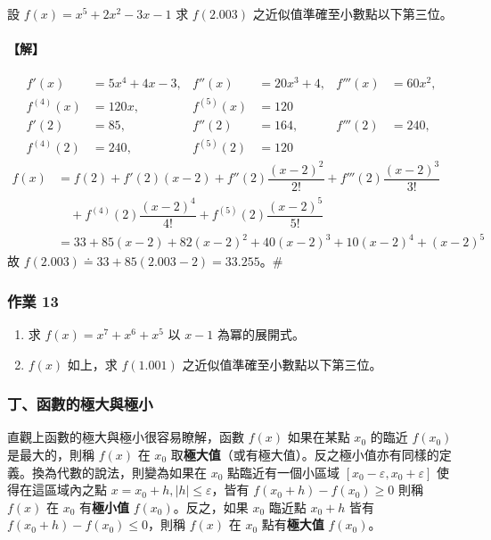 \begin{example}\label{ex:b6s-2-21}
設 $f(x)=x^5+2x^2-3x-1$ 求 $f(2.003)$ 之近似值準確至小數點以下第三位。
\end{example}

\paragraph{【解】}
\begin{align*}
f'(x) &= 5x^4+4x-3, & f''(x) &= 20x^3+4, & f'''(x) &= 60x^2, \\
f^{(4)}(x) &= 120x, & f^{(5)}(x) &= 120 \\
f'(2) &= 85, & f''(2) &= 164, & f'''(2) &= 240, \\
f^{(4)}(2) &= 240, & f^{(5)}(2) &= 120
\end{align*}
\begin{align*}
f(x) &= f(2) + f'(2)(x-2) + f''(2)\dfrac{(x-2)^2}{2!} + f'''(2)\dfrac{(x-2)^3}{3!} \\
&\quad + f^{(4)}(2)\dfrac{(x-2)^4}{4!} + f^{(5)}(2)\dfrac{(x-2)^5}{5!} \\
&= 33 + 85(x-2) + 82(x-2)^2 + 40(x-2)^3 + 10(x-2)^4 + (x-2)^5
\end{align*}
故 $f(2.003) \doteq 33 + 85(2.003-2) = 33.255$。\hfill$\#$

\subsubsection*{作業 13}\label{hw:b6s-2-13}
\begin{enumerate}[label=(\roman*), leftmargin=2em]
  \item 求 $f(x)=x^7+x^6+x^5$ 以 $x-1$ 為冪的展開式。
  \item $f(x)$ 如上，求 $f(1.001)$ 之近似值準確至小數點以下第三位。
\end{enumerate}

\subsubsection*{丁、函數的極大與極小}\label{subsec:b6s-2-4-d}

直觀上函數的極大與極小很容易瞭解，函數 $f(x)$ 如果在某點 $x_0$ 的臨近 $f(x_0)$ 是最大的，則稱 $f(x)$ 在 $x_0$ 取\textbf{極大值}（或有極大值）。反之極小值亦有同樣的定義。換為代數的說法，則變為如果在 $x_0$ 點臨近有一個小區域 $[x_0-\varepsilon, x_0+\varepsilon]$ 使得在這區域內之點 $x=x_0+h, |h| \le \varepsilon$，皆有 $f(x_0+h)-f(x_0) \ge 0$ 則稱 $f(x)$ 在 $x_0$ 有\textbf{極小值} $f(x_0)$。反之，如果 $x_0$ 臨近點 $x_0+h$ 皆有 $f(x_0+h)-f(x_0) \le 0$，則稱 $f(x)$ 在 $x_0$ 點有\textbf{極大值} $f(x_0)$。

